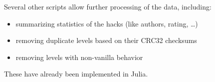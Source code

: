 Several other scripts allow further processing of the data, including:
\begin{itemize}
\item summarizing statistics of the hacks (like authors, rating,
  \dots)
\item removing duplicate levels based on their CRC32 checksums
\item removing levels with non-vanilla behavior
\end{itemize}
These have already been implemented in Julia.



